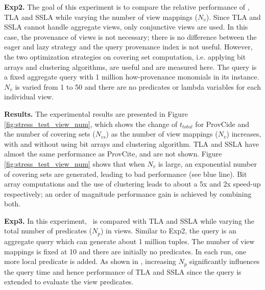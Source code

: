 \textbf{Exp2.} The goal of this experiment is to compare the relative performance of \provalg, TLA and SSLA while varying the number of view mappings ($N_v$). Since TLA and SSLA cannot handle aggregate views, only conjunctive views are used. In this case, the provenance of views is not necessary; there is no difference between the eager and lazy strategy and the query provenance index is not useful. 
However, the two optimization strategies on covering set computation, i.e. applying bit arrays and clustering algorithms, are useful and are measured here. The query is a fixed aggregate query with 1 million how-provenance monomials in its instance. $N_v$ is varied from 1 to 50 and there are no predicates or lambda variables for each individual view. 

\textbf{Results.}
The experimental results are presented in Figure \ref{fig:stress_test_view_num}, which shows the change of $t_{total}$ for ProvCide and the number of covering sets ($N_{cs}$) as the number of view mappings ($N_v$) increases, with and without using bit arrays and clustering algorithm. TLA and SSLA have almost the same performance as ProvCite, and are not shown. Figure \ref{fig:stress_test_view_num} shows that when $N_v$ is large, an exponential number of covering sets are generated, leading to bad performance (see blue line). Bit array computations and the use of clustering leads to about a 5x and 2x speed-up respectively; an order of magnitude performance gain is achieved by combining both.


\textbf{Exp3.} In this experiment, \provalg\ is compared with TLA and SSLA while varying the total number of predicates ($N_p$) in views. Similar to Exp2, the query is an aggregate query which can generate about 1 million tuples. The number of view mappings is fixed at 10 and there are initially no predicates. In each run, one more local predicate is added. As shown in \cite{wu2018data}, increasing $N_p$  significantly influences the query time and hence performance of TLA and SSLA since the query is extended to evaluate the view predicates. 

